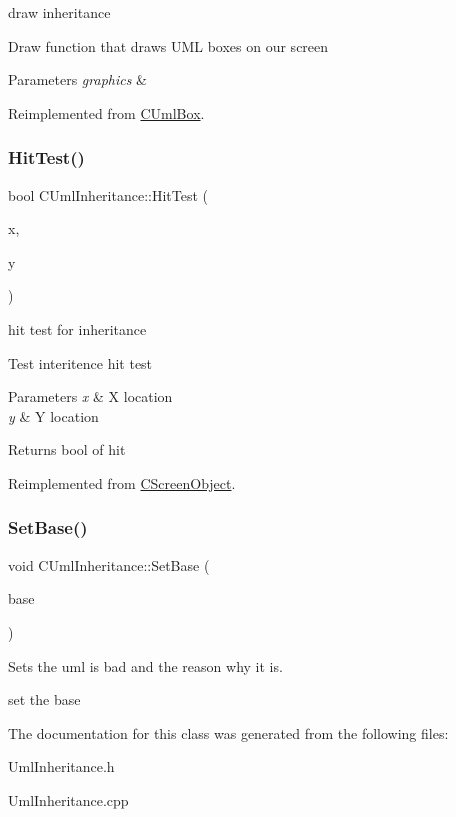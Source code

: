 draw inheritance 

Draw function that draws U\+ML boxes on our screen 
\begin{DoxyParams}{Parameters}
{\em graphics} & \\
\hline
\end{DoxyParams}


Reimplemented from \mbox{\hyperlink{class_c_uml_box_a9f4f8ae512bae9039279a62923435846}{C\+Uml\+Box}}.

\mbox{\label{class_c_uml_inheritance_a2ea7bb7da84ad2e16bdc7a1ba44985a1}} 
\subsubsection{\texorpdfstring{HitTest()}{HitTest()}}
{\footnotesize\ttfamily bool C\+Uml\+Inheritance\+::\+Hit\+Test (\begin{DoxyParamCaption}\item[{int}]{x,  }\item[{int}]{y }\end{DoxyParamCaption})\hspace{0.3cm}{\ttfamily [virtual]}}



hit test for inheritance 

Test interitence hit test 
\begin{DoxyParams}{Parameters}
{\em x} & X location \\
\hline
{\em y} & Y location \\
\hline
\end{DoxyParams}
\begin{DoxyReturn}{Returns}
bool of hit 
\end{DoxyReturn}


Reimplemented from \mbox{\hyperlink{class_c_screen_object_a92a3f69608fa214184c0c82a33569a07}{C\+Screen\+Object}}.

\mbox{\label{class_c_uml_inheritance_a29a6e31bd95eb972aa8a0cb2cfe4012c}} 
\subsubsection{\texorpdfstring{SetBase()}{SetBase()}}
{\footnotesize\ttfamily void C\+Uml\+Inheritance\+::\+Set\+Base (\begin{DoxyParamCaption}\item[{std\+::shared\+\_\+ptr$<$ \mbox{\hyperlink{class_c_uml_box}{C\+Uml\+Box}} $>$}]{base }\end{DoxyParamCaption})\hspace{0.3cm}{\ttfamily [inline]}}



Sets the uml is bad and the reason why it is. 

set the base 

The documentation for this class was generated from the following files\+:\begin{DoxyCompactItemize}
\item 
Uml\+Inheritance.\+h\item 
Uml\+Inheritance.\+cpp\end{DoxyCompactItemize}
